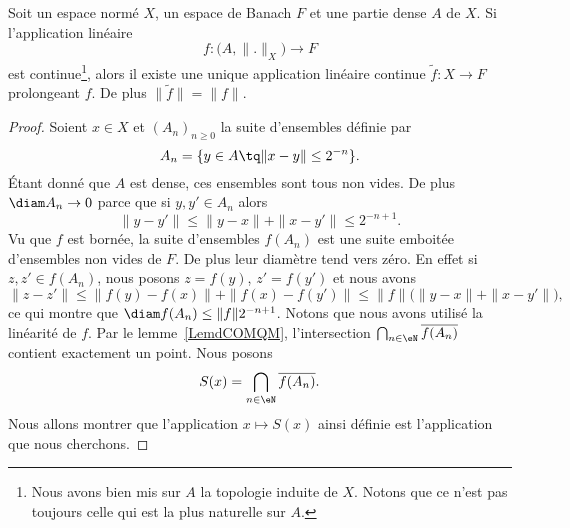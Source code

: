 \begin{proposition} \label{PropTTiRgAq}
    Soit un espace normé \( X\), un espace de Banach \( F\) et une partie dense \( A\) de \( X\). Si l'application linéaire
    \begin{equation}
        f\colon   \big( A,\| . \|_X \big)  \to F
    \end{equation}
    est continue\footnote{Nous avons bien mis sur \( A\) la topologie induite de \( X\). Notons que ce n'est pas toujours celle qui est la plus naturelle sur \( A\).}, alors il existe une unique application linéaire continue \( \tilde f\colon X\to F\) prolongeant \( f\). De plus \( \| \tilde f \|=\| f \|\).
\end{proposition}

\begin{proof}
    Soient \( x\in X\) et $(A_n)_{n\geq 0}$ la suite d'ensembles définie par
    \begin{equation}
        A_n=\{ y\in A\tq \| x-y \|\leq 2^{-n}\}.
    \end{equation}
    Étant donné que \( A\) est dense, ces ensembles sont tous non vides. De plus \( \diam A_n\to 0\) parce que si \( y,y'\in A_n\) alors
    \begin{equation}
        \| y-y' \|\leq\| y-x \|+\| x-y' \|\leq 2^{-n+1}.
    \end{equation}
    Vu que \( f\) est bornée, la suite d'ensembles \( f(A_n)\) est une suite emboitée d'ensembles non vides de \( F\). De plus leur diamètre tend vers zéro. En effet si \( z,z'\in f(A_n)\), nous posons \( z=f(y)\), \( z'=f(y')\) et nous avons
    \begin{equation}
        \| z-z' \|\leq \| f(y)-f(x) \|+\| f(x)-f(y') \|\leq \| f \|\big( \| y-x \|+\| x-y' \| \big),
    \end{equation}
    ce qui montre que \( \diam f(A_n)\leq \| f \|2^{-n+1}\).  Notons que nous avons utilisé la linéarité de \( f\). Par le lemme~\ref{LemdCOMQM}, l'intersection \( \bigcap_{n\in \eN}\overline{ f(A_n) }\) contient exactement un point. Nous posons
    \begin{equation}
        S(x)=\bigcap_{n\in \eN}\overline{ f(A_n) }.
    \end{equation}
    Nous allons montrer que l'application \( x\mapsto S(x)\) ainsi définie est l'application que nous cherchons.


\end{proof}
